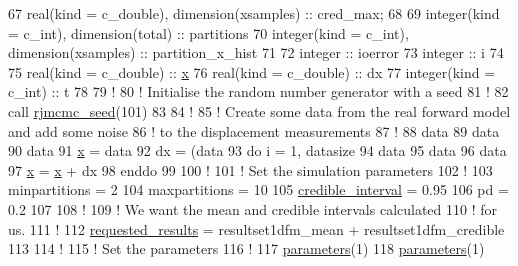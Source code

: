 \begin{DoxyCodeInclude}
67 \textcolor{keywordtype}{real(kind = c\_double)}, \textcolor{keywordtype}{dimension(xsamples)} :: cred\_max;
68 
69 \textcolor{keywordtype}{integer(kind = c\_int)}, \textcolor{keywordtype}{dimension(total)} :: partitions
70 \textcolor{keywordtype}{integer(kind = c\_int)}, \textcolor{keywordtype}{dimension(xsamples)} :: partition\_x\_hist
71 
72 \textcolor{keywordtype}{integer} :: ioerror
73 \textcolor{keywordtype}{integer} :: i
74 
75 \textcolor{keywordtype}{real(kind = c\_double)} :: \hyperlink{wellrng_8c_a676e0da0ef83bbbdf42538e54b97506b}{x}
76 \textcolor{keywordtype}{real(kind = c\_double)} :: dx
77 \textcolor{keywordtype}{integer(kind = c\_int)} :: t
78 
79 \textcolor{comment}{!}
80 \textcolor{comment}{! Initialise the random number generator with a seed}
81 \textcolor{comment}{!}
82 \textcolor{keyword}{call }\hyperlink{rjmcmc__random_8c_a0cbc991b84d0f6b749e9b45cbc018d2a}{rjmcmc\_seed}(101)
83 
84 \textcolor{comment}{!}
85 \textcolor{comment}{! Create some data from the real forward model and add some noise}
86 \textcolor{comment}{! to the displacement measurements}
87 \textcolor{comment}{!}
88 data%
89 data%
90 data%
91 \hyperlink{wellrng_8c_a676e0da0ef83bbbdf42538e54b97506b}{x} = data%
92 dx = (data%
93 \textcolor{keywordflow}{do} i = 1, datasize
94    data%
95    data%
96    data%
97    \hyperlink{wellrng_8c_a676e0da0ef83bbbdf42538e54b97506b}{x} = \hyperlink{wellrng_8c_a676e0da0ef83bbbdf42538e54b97506b}{x} + dx
98 \textcolor{keywordflow}{enddo}
99 
100 \textcolor{comment}{!}
101 \textcolor{comment}{! Set the simulation parameters}
102 \textcolor{comment}{!}
103 minpartitions = 2
104 maxpartitions = 10
105 \hyperlink{rjmcmcf__mpi_8h_a5a7722a5cc210713ec1b3956fde06e70}{credible\_interval} = 0.95
106 pd = 0.2
107 
108 \textcolor{comment}{!}
109 \textcolor{comment}{! We want the mean and credible intervals calculated}
110 \textcolor{comment}{! for us.}
111 \textcolor{comment}{!}
112 \hyperlink{rjmcmcf__mpi_8h_a141ddf12f08f2f9e95036a6cd06324ff}{requested\_results} = resultset1dfm\_mean + resultset1dfm\_credible
113 
114 \textcolor{comment}{!}
115 \textcolor{comment}{! Set the parameters}
116 \textcolor{comment}{!}
117 \hyperlink{rjmcmcf__mpi_8h_af69ab156c03e104279d5e0cb70a0d4c4}{parameters}(1)%
118 \hyperlink{rjmcmcf__mpi_8h_af69ab156c03e104279d5e0cb70a0d4c4}{parameters}(1)%

\end{DoxyCodeInclude}
